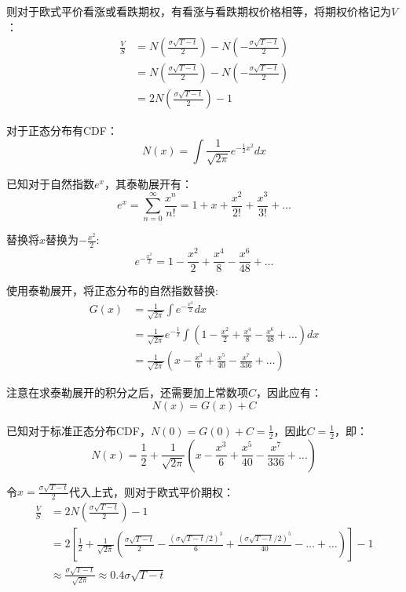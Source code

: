 \documentclass[11pt]{article}
\begin{document}
则对于欧式平价看涨或看跌期权，有看涨与看跌期权价格相等，将期权价格记为$V$：
\begin{align*}
    \frac{V}{S} &= N \left( \frac{\sigma\sqrt{T-t}}{2} \right) - N\left( -\frac{\sigma\sqrt{T-t}}{2} \right) \\
    & = N \left( \frac{\sigma\sqrt{T-t}}{2} \right) - N\left( -\frac{\sigma\sqrt{T-t}}{2} \right) \\
    & = 2N\left( \frac{\sigma\sqrt{T-t}}{2} \right) - 1
\end{align*}

对于正态分布有CDF：
\begin{equation*}
   N(x) = \int \frac{1}{\sqrt{2\pi}} e^{-\frac{1}{2}x^2} dx
\end{equation*}

已知对于自然指数$e^x$，其泰勒展开有：
\begin{equation*}
    e^x = \sum^{\infty}_{n=0} \frac{x^n}{n!} = 1 + x + \frac{x^2}{2!} + \frac{x^3}{3!} + \dots
\end{equation*}

替换将$x$替换为$-\frac{x^2}{2}$:
\begin{equation*}
    e^{-\frac{x^2}{2}} = 1 -\frac{x^2}{2}  + \frac{x^4}{8} - \frac{x^6}{48} + \dots
\end{equation*}

使用泰勒展开，将正态分布的自然指数替换:
\begin{align*}
   G(x) &= \frac{1}{\sqrt{2\pi}} \int e^{-\frac{x^2}{2}} dx \\
   &= \frac{1}{\sqrt{2\pi}} e^{-\frac{1}{2}} \int \left( 1 -\frac{x^2}{2}  + \frac{x^4}{8} - \frac{x^6}{48} + \dots \right) dx \\
   &= \frac{1}{\sqrt{2\pi}} \left( x -\frac{x^3}{6} + \frac{x^5}{40} - \frac{x^7}{336} + \dots \right) 
\end{align*}

注意在求泰勒展开的积分之后，还需要加上常数项$C$，因此应有：
\begin{equation*}
    N(x) = G(x) + C
\end{equation*}

已知对于标准正态分布CDF，$N(0) = G(0) + C = \frac{1}{2}$，因此$C=\frac{1}{2}$，即：
\begin{equation*}
   N(x) = \frac{1}{2} + \frac{1}{\sqrt{2\pi}} \left( x -\frac{x^3}{6} + \frac{x^5}{40} - \frac{x^7}{336} + \dots \right) 
\end{equation*}

令$x=\frac{\sigma\sqrt{T-t}}{2}$代入上式，则对于欧式平价期权：
\begin{align*}
    \frac{V}{S} & = 2N\left( \frac{\sigma\sqrt{T-t}}{2} \right) - 1 \\
    & = 2\left[\frac{1}{2} + \frac{1}{\sqrt{2\pi}} \left(\frac{\sigma\sqrt{T-t}}{2} - \frac{(\sigma\sqrt{T-t}/2)^3}{6} + \frac{(\sigma\sqrt{T-t}/2)^5}{40} - \dots + \dots\right) \right] - 1\\
    &\approx \frac{\sigma\sqrt{T-t}}{\sqrt{2\pi}} \approx 0.4\sigma\sqrt{T-t}
\end{align*}
\end{document}
